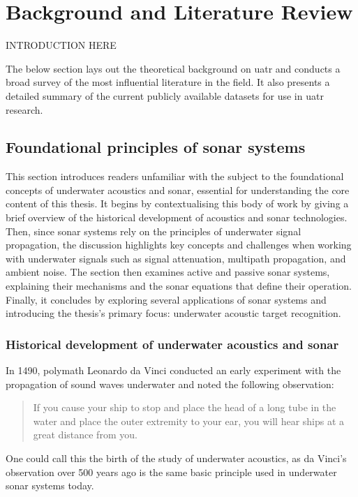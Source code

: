 \chapter{Background and Literature Review}

{\Large INTRODUCTION HERE}

The below section lays out the theoretical background on \acrfull{uatr} and conducts a broad survey of the most influential literature in the field. It also presents a detailed summary of the current publicly available datasets for use in \acrshort{uatr} research.

\section{Foundational principles of sonar systems}

This section introduces readers unfamiliar with the subject to the foundational concepts of underwater acoustics and sonar, essential for understanding the core content of this thesis. It begins by contextualising this body of work by giving a brief overview of the historical development of acoustics and sonar technologies. Then, since sonar systems rely on the principles of underwater signal propagation, the discussion highlights key concepts and challenges when working with underwater signals such as signal attenuation, multipath propagation, and ambient noise. The section then examines active and passive sonar systems, explaining their mechanisms and the sonar equations that define their operation. Finally, it concludes by exploring several applications of sonar systems and introducing the thesis's primary focus: underwater acoustic target recognition.

\subsection{Historical development of underwater acoustics and sonar}\label{sec:uw-history}

In 1490, polymath Leonardo da Vinci conducted an early experiment with the propagation of sound waves underwater and noted the following observation:
\begin{quote}
    If you cause your ship to stop and place the head of a long tube in the water and place the outer extremity to your ear, you will hear ships at a great distance from you. \cite{urick_principles_1975}
\end{quote}
One could call this the birth of the study of underwater acoustics, as da Vinci's observation over 500 years ago is the same basic principle used in underwater sonar systems today.


